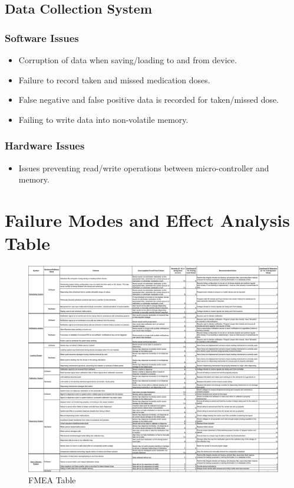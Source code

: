 \documentclass[12pt,titlepage]{article}
\begin{document}
\subsection{Data Collection System}
\subsubsection*{Software Issues}
\begin{itemize}
\item Corruption of data when saving/loading to and from device.
\item Failure to record taken and missed medication doses.
\item False negative and false positive data is recorded for taken/missed dose.
\item Failing to write data into non-volatile memory.
\end{itemize}
\subsubsection*{Hardware Issues}
\begin{itemize}
\item Issues preventing read/write operations between micro-controller and memory.
\end{itemize}

\pagebreak
\section{Failure Modes and Effect Analysis Table}


\begin{figure}[!htbp]
    \includegraphics[width=\textwidth,height=\textheight,keepaspectratio]{./fmea.png}
    \caption{FMEA Table}
    \label{fig:my_label}
\end{figure}
\end{document}
